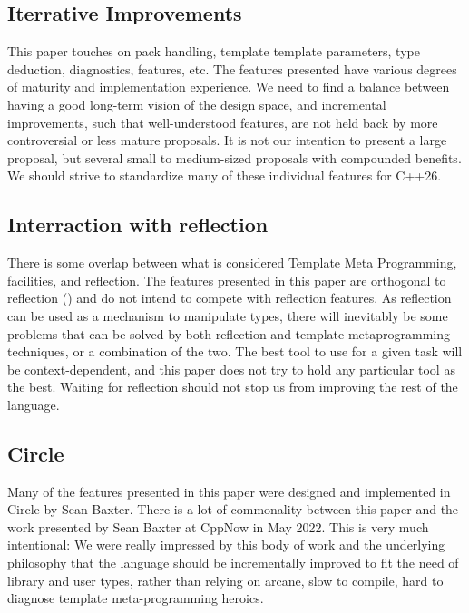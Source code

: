 \documentclass{wg21}
\begin{document}
\subsection{Iterrative Improvements}

This paper touches on pack handling, template template parameters, type deduction, diagnostics,  features, etc.
The features presented have various degrees of maturity and implementation experience.
We need to find a balance between having a good long-term vision of the design space, and incremental improvements, such that well-understood features,
are not held back by more controversial or less mature proposals.
It is not our intention to present a large proposal, but several small to medium-sized proposals with compounded benefits.
We should strive to standardize many of these individual features for C++26.

\subsection{Interraction with reflection}

There is some overlap between what is considered Template Meta Programming,  facilities, and reflection.
The features presented in this paper are orthogonal to reflection () and do not intend to compete with reflection features.
As reflection can be used as a mechanism to manipulate types, there will inevitably be some problems that can be solved by both reflection
and template metaprogramming techniques, or a combination of the two. The best tool to use for a given task will be context-dependent,
and this paper does not try to hold any particular tool as the best.
Waiting for reflection should not stop us from improving the rest of the language.

\subsection{Circle}

Many of the features presented in this paper were designed and implemented in Circle by Sean Baxter.
There is a lot of commonality between this paper and the work presented by Sean Baxter at CppNow in May 2022.
This is very much intentional: We were really impressed by this body of work and the underlying philosophy that the language should be incrementally improved
to fit the need of library and user types, rather than relying on arcane, slow to compile, hard to diagnose template meta-programming heroics.
\end{document}

